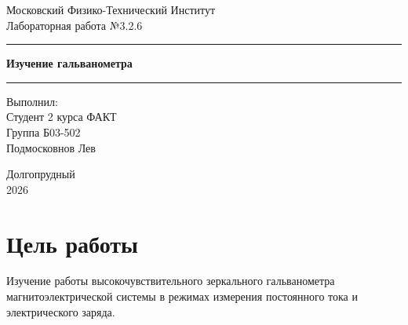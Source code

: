 \documentclass[a4paper, 12pt]{article}
\begin{document}

\begin{titlepage}
    \begin{center}

        \vspace*{5cm}

        {\Huge Московский Физико-Технический Институт}\\[2cm]

        {\LARGE Лабораторная работа №3.2.6}\\[0.25cm]

        \noindent\rule{\textwidth}{1pt}
        \vspace*{-0.25cm}

        {\huge \textbf{Изучение гальванометра}}

        \noindent\rule{\textwidth}{1pt}

        \vfill

    \end{center}

    \begin{flushright}
        \begin{minipage}{0.45\textwidth}
            {\Large
                Выполнил:\\
                Студент 2 курса ФАКТ\\
                Группа Б03-502\\
                Подмосковнов Лев
            }
        \end{minipage}
    \end{flushright}

    \vfill

    \begin{center}
        Долгопрудный\\2026
    \end{center}

\end{titlepage}
\restoregeometry

\setcounter{page}{2}

\section{Цель работы}
Изучение работы высокочувствительного зеркального гальванометра магнитоэлектрической системы в режимах измерения постоянного тока и электрического заряда.
\end{document}
